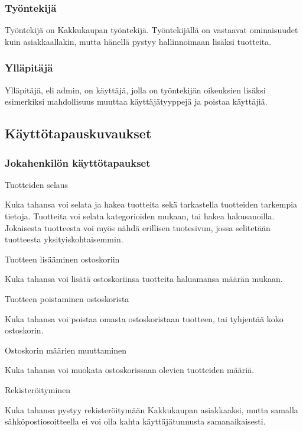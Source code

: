 \documentclass[a4paper,12pt, titlepage]{article}
\begin{document}
\subsubsection*{Työntekijä}
Työntekijä on Kakkukaupan työntekijä. Työntekijällä on vastaavat ominaisuudet kuin asiakkaallakin, mutta hänellä pystyy hallinnoimaan lisäksi tuotteita.
\subsubsection*{Ylläpitäjä}
Ylläpitäjä, eli admin, on käyttäjä, jolla on työntekijän oikeuksien lisäksi esimerkiksi mahdollisuus muuttaa käyttäjätyyppejä ja poistaa käyttäjiä.

\subsection{Käyttötapauskuvaukset}
\subsubsection*{Jokahenkilön käyttötapaukset}

Tuotteiden selaus
\begin{adjustwidth}{2.5em}{0pt}
Kuka tahansa voi selata ja hakea tuotteita sekä tarkastella tuotteiden tarkempia tietoja. Tuotteita voi selata kategorioiden mukaan, tai hakea hakusanoilla. Jokaisesta tuotteesta voi myös nähdä erillisen tuotesivun, jossa selitetään tuotteesta yksityiskohtaisemmin.
\end{adjustwidth}
\hfill

\noindent
Tuotteen lisääminen ostoskoriin
\begin{adjustwidth}{2.5em}{0pt}
Kuka tahansa voi lisätä ostoskoriinsa tuotteita haluamansa määrän mukaan.
\end{adjustwidth}
\hfill

\noindent
Tuotteen poistaminen ostoskorista
\begin{adjustwidth}{2.5em}{0pt}
Kuka tahansa voi poistaa omasta ostoskoristaan tuotteen, tai tyhjentää koko ostoskorin.
\end{adjustwidth}
\hfill

\noindent
Ostoskorin määrien muuttaminen
\begin{adjustwidth}{2.5em}{0pt}
Kuka tahansa voi muokata ostoskorissaan olevien tuotteiden määriä.
\end{adjustwidth}
\hfill

\noindent
Rekisteröityminen
\begin{adjustwidth}{2.5em}{0pt}
Kuka tahansa pystyy rekisteröitymään Kakkukaupan asiakkaaksi, mutta samalla sähköpostiosoitteella ei voi olla kahta käyttäjätunnusta samanaikaisesti.
\end{adjustwidth}
\hfill
\end{document}
